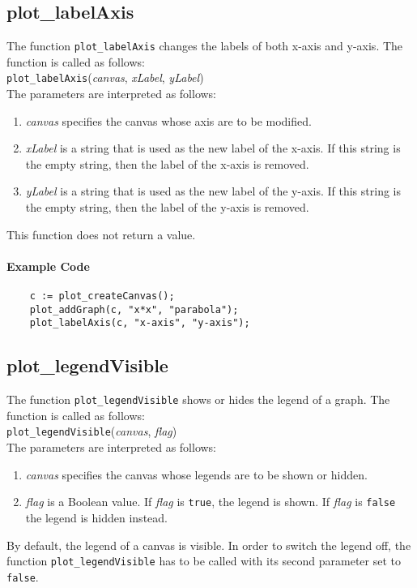 \subsection{plot\_labelAxis}
The function \texttt{plot\_labelAxis} changes the labels of both x-axis and y-axis.  The function is
called as follows:
\\[0.2cm]
\hspace*{1.3cm}
\texttt{plot\_labelAxis}(\textsl{canvas}, \textsl{xLabel}, \textsl{yLabel})
\\[0.2cm]
The parameters are interpreted as follows: 
\begin{enumerate}
\item \textsl{canvas} specifies the canvas whose axis are to be modified.
\item \textsl{xLabel} is a string that is used as the new label of the x-axis.
      If this string is the empty string, then the label of the x-axis is removed.
\item \textsl{yLabel} is a string that is used as the new label of the y-axis.
      If this string is the empty string, then the label of the y-axis is removed.
\end{enumerate}
This function does not return a value.

\paragraph{Example Code}
\begin{verbatim}
    c := plot_createCanvas();
    plot_addGraph(c, "x*x", "parabola");
    plot_labelAxis(c, "x-axis", "y-axis");
\end{verbatim}

\subsection{plot\_legendVisible}
The function \texttt{plot\_legendVisible} shows or hides the legend of a graph.
The function is called  as follows:
\\[0.2cm]
\hspace*{1.3cm}
\texttt{plot\_legendVisible}(\textsl{canvas}, \textsl{flag})
\\[0.2cm]
The parameters are interpreted as follows:
\begin{enumerate}
\item \textsl{canvas} specifies the canvas whose legends are to be shown or hidden.
\item \textsl{flag} is a Boolean value.  If \textsl{flag} is \texttt{true}, the legend is shown.
      If \textsl{flag} is \texttt{false} the legend is hidden instead.  
\end{enumerate}
By default, the legend of a canvas is visible.  In order to switch the legend off, the function
\texttt{plot\_legendVisible} has to be called with its second parameter set to \texttt{false}.

